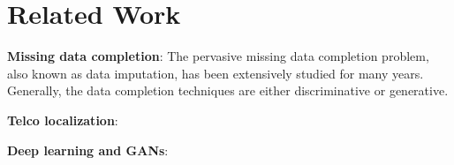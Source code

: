\section{Related Work}

\textbf{Missing data completion}:
The pervasive missing data completion problem, also known as data imputation, has been extensively studied for many years. Generally, the data completion techniques are either discriminative or generative.

\textbf{Telco localization}:

\textbf{Deep learning and GANs}: